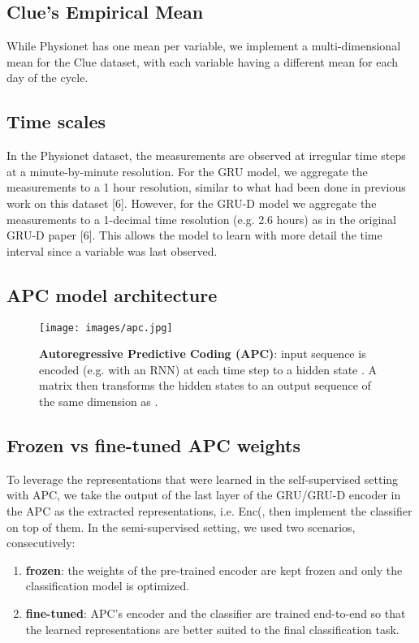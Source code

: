 \documentclass{article}
\begin{document}
\newpage
\subsection{\large Clue's Empirical Mean}
While Physionet has one mean per variable, we implement a multi-dimensional mean for the Clue dataset, with each variable having a different mean for each day of the cycle.

\subsection{\large Time scales}
In the Physionet dataset, the measurements are observed at irregular time steps
at a minute-by-minute resolution. For the GRU model, we aggregate the measurements to a 1 hour resolution, 
similar to what had been done in previous work on this dataset [6].
However, for the GRU-D model we aggregate the measurements to a 1-decimal time resolution (e.g. 2.6 hours) as in the original GRU-D paper [6].
This allows the model to learn with more detail the time interval since a variable was last observed.

\subsection{\large APC model architecture}
\begin{figure}[ht]
\vskip 0.05in
\begin{center}
\centerline{\texttt{[image: images/apc.jpg]}}
\caption{\textbf{Autoregressive Predictive Coding (APC)}: input sequence  is encoded (e.g. with an RNN) at each time step to a hidden state . A matrix  then transforms the hidden states to an output sequence  of the same dimension as .} 
\label{APC}
\end{center}
\vskip -0.25in
\end{figure}

\subsection{\large Frozen vs fine-tuned APC weights}
To leverage the representations that were learned in the self-supervised setting with APC, we take the output of the last layer of the GRU/GRU-D encoder in the APC as the extracted representations, i.e. Enc(, then implement the classifier on top of them. 
In the semi-supervised setting, we used two scenarios, consecutively:
\begin{enumerate}
\setlength\itemsep{0em}
    \item \textbf{frozen}: the weights of the pre-trained encoder are kept frozen and only the classification model is optimized.
    \item \textbf{fine-tuned}: APC's encoder and the classifier are trained end-to-end so that the learned representations are better suited to the final classification task. 
\end{enumerate}
\end{document}
